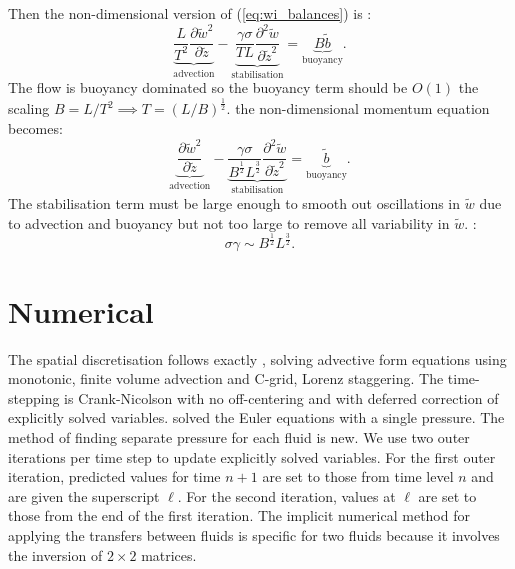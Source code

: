 \documentclass[draft]{agujournal2019}
\begin{document}
Then the non-dimensional version of (\ref{eq:wi_balances}) is :
\begin{equation}
\underbrace{{\frac{L}{T^{2}}\frac{\partial\tilde{w}^{2}}{\partial\tilde{z}}}}_{\text{advection}}-\underbrace{{\frac{\gamma\sigma}{TL}\frac{\partial^{2}\tilde{w}}{\partial\tilde{z}^{2}}}}_{\text{stabilisation}}=\underbrace{B\tilde{b}}_{\text{buoyancy}}.\label{eq:wi_nonDomTmp}
\end{equation}
The flow is buoyancy dominated so the buoyancy term should be $O(1)$
 the scaling $B=L/T^{2}\implies T=(L/B)^{\frac{1}{2}}$.  the non-dimensional momentum equation becomes:
\begin{equation}
\underbrace{{\frac{\partial\tilde{w}^{2}}{\partial\tilde{z}}}}_{\text{advection}}-\underbrace{{\frac{\gamma\sigma}{B^{\frac{1}{2}}L^{\frac{3}{2}}}\frac{\partial^{2}\tilde{w}}{\partial\tilde{z}^{2}}}}_{\text{stabilisation}}=\underbrace{\tilde{b}}_{\text{buoyancy}}.\label{eq:wi_nonDom-1}
\end{equation}
The stabilisation term must be large enough to smooth out oscillations
in $\tilde{w}$ due to advection and buoyancy but not too large to
remove all variability in $\tilde{w}$. :
\begin{equation}
\sigma\gamma\sim B^{\frac{1}{2}}L^{\frac{3}{2}}.\label{eq:gammaDimAnal}
\end{equation}
\section{\label{sec:numerics}Numerical }

The spatial discretisation follows exactly , solving
advective form equations using monotonic, finite volume advection
and C-grid, Lorenz staggering. The time-stepping is Crank-Nicolson
with no off-centering and with deferred correction of explicitly solved
variables.  
{solved the Euler equations with a single pressure. The method of finding separate pressure for each fluid is new.}
We use two outer iterations per
time step to update explicitly solved variables. For the first outer
iteration, predicted values for time $n+1$ are set to those from
time level $n$ and are given the superscript $\ell$. For the second
iteration, values at $\ell$ are set to those from the end of the
first iteration. The implicit numerical method for applying the transfers
between fluids is specific for two fluids because it involves the
inversion of $2\times2$ matrices. 
\end{document}
